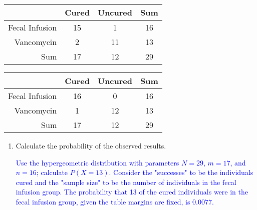 \documentclass[letterpaper,12pt,twoside,]{pinp}
\begin{document}
\begin{enumerate}
\begin{enumerate}
    \begin{table}[h]
     \centering
     \color{gray}
     \begin{tabular}{r|cc|c}
     \hline
     & Cured & Uncured & Sum \\ 
     \hline
     Fecal Infusion & \textcolor{black}{15} & \textcolor{black}{1} & 16 \\ 
     Vancomycin & \textcolor{black}{2} & \textcolor{black}{11} & 13 \\ 
     \hline
     Sum & 17 & 12 & 29 \\ 
     \hline
     \end{tabular}
     \end{table}

    \begin{table}[h]
     \centering
     \color{gray}
     \begin{tabular}{r|cc|c}
     \hline
     & Cured & Uncured & Sum \\ 
     \hline
     Fecal Infusion & \textcolor{black}{16} & \textcolor{black}{0} & 16 \\ 
     Vancomycin & \textcolor{black}{1} & \textcolor{black}{12} & 13 \\ 
     \hline
     Sum & 17 & 12 & 29 \\ 
     \hline
     \end{tabular}
       \end{table}
  \end{enumerate}

  \color{black}

  \begin{enumerate}
  \def\labelenumii{\alph{enumii})}
  \setcounter{enumii}{3}
  \item
    Calculate the probability of the observed results.

    \textcolor{blue}{Use the hypergeometric distribution with parameters $N = 29$, $m = 17$, and $n = 16$; calculate $P(X = 13)$. Consider the "successes" to be the individuals cured and the "sample size" to be the number of individuals in the fecal infusion group. The probability that 13 of the cured individuals were in the fecal infusion group, given the table margins are fixed, is 0.0077.}
  \end{enumerate}

\begin{Shaded}
\begin{Highlighting}[]
\NormalTok{(}\NormalTok{, }\NormalTok{, } \OperatorTok{-}\StringTok{ }\NormalTok{, }\NormalTok{)}
\end{Highlighting}
\end{Shaded}


\end{enumerate}
\end{document}
